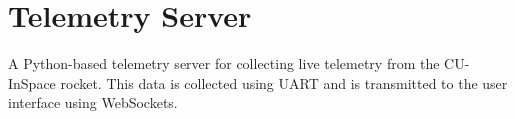 \sectionfont{\fontsize{14}{14}\selectfont}
\section{Telemetry Server}

A Python-based telemetry server for collecting live telemetry from the CU-InSpace rocket. 
This data is collected using UART and is transmitted to the user interface using WebSockets.



